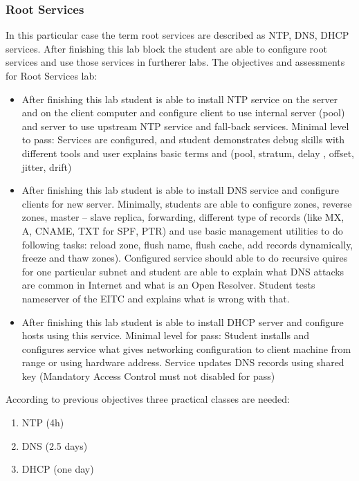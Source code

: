 \subsubsection{Root Services}
In this particular case the term root services are described as \gls{NTP}, \gls{DNS}, \gls{DHCP} services.
After finishing this lab block the student are able to configure root services and use those services in furtherer labs.
The objectives and assessments for Root Services lab:
\begin{itemize}
\item After finishing this lab student is able to install \gls{NTP} service on the server and on the client computer and configure client to use internal server (pool) and server to use upstream \gls{NTP} service and fall-back services. Minimal level to pass: Services are configured, and student demonstrates debug skills with different tools and user explains basic terms and (pool, stratum, delay , offset, jitter, drift)
\item After finishing this lab student is able to install \gls{DNS} service and configure clients for new server. Minimally, students are able to configure zones, reverse zones, master -- slave replica, forwarding, different type of records (like MX, A, CNAME, TXT for SPF, PTR) and use basic management utilities to do following tasks: reload zone, flush name, flush cache, add records dynamically, freeze and thaw zones). Configured service should able to do recursive quires for one particular subnet and student are able to explain what DNS attacks are common in Internet and what is an Open Resolver. Student tests nameserver of the \gls{EITC} and explains what is wrong with that.
\item After finishing this lab student is able to install \gls{DHCP} server and configure hosts using this service. Minimal level for pass: Student installs and configures service what gives networking configuration to client machine from range or using hardware address. Service updates \gls{DNS} records using shared key (Mandatory Access Control must not disabled for pass)
\end{itemize}
According to previous objectives three practical classes are needed:
\begin{enumerate}[label=LAB \arabic*.,leftmargin=*]
  	\item NTP (4h)
  	\item DNS (2.5 days)
  	\item DHCP (one day)
\end{enumerate}

